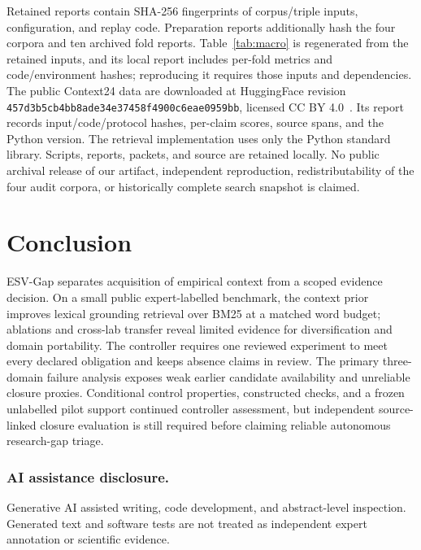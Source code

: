 \documentclass[runningheads]{llncs}
\begin{document}
Retained reports contain SHA-256 fingerprints of corpus/triple inputs, configuration, and replay code. Preparation reports additionally hash the four corpora and ten archived fold reports. Table~\ref{tab:macro} is regenerated from the retained inputs, and its local report includes per-fold metrics and code/environment hashes; reproducing it requires those inputs and dependencies. The public Context24 data are downloaded at HuggingFace revision \texttt{457d3b5cb4bb8ade34e37458f4900c6eae0959bb}, licensed CC BY 4.0~\cite{contextdata}. Its report records input/code/protocol hashes, per-claim scores, source spans, and the Python version. The retrieval implementation uses only the Python standard library. Scripts, reports, packets, and source are retained locally. No public archival release of our artifact, independent reproduction, redistributability of the four audit corpora, or historically complete search snapshot is claimed.

\section{Conclusion}
ESV-Gap separates acquisition of empirical context from a scoped evidence decision. On a small public expert-labelled benchmark, the context prior improves lexical grounding retrieval over BM25 at a matched word budget; ablations and cross-lab transfer reveal limited evidence for diversification and domain portability. The controller requires one reviewed experiment to meet every declared obligation and keeps absence claims in review. The primary three-domain failure analysis exposes weak earlier candidate availability and unreliable closure proxies. Conditional control properties, constructed checks, and a frozen unlabelled pilot support continued controller assessment, but independent source-linked closure evaluation is still required before claiming reliable autonomous research-gap triage.

\subsubsection*{AI assistance disclosure.}
Generative AI assisted writing, code development, and abstract-level inspection. Generated text and software tests are not treated as independent expert annotation or scientific evidence.
\end{document}
